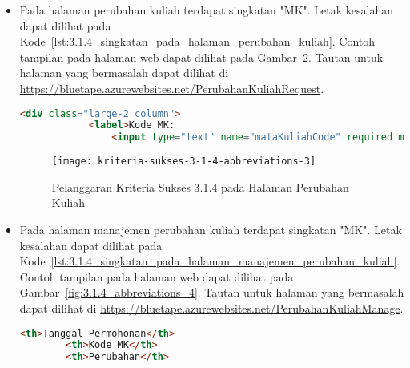 \begin{itemize}
    \begin{figure}[h]
        \centering  
        \texttt{[image: kriteria-sukses-3-1-4-abbreviations-2]}  
        \caption[Pelanggaran Kriteria Sukses 3.1.4 pada Halaman Manajemen Cetak Transkrip]{Pelanggaran Kriteria Sukses 3.1.4 pada Halaman Manajemen Cetak Transkrip}
        \label{fig:3.1.4_abbreviations_2}  
    \end{figure}
    
    \item Pada halaman perubahan kuliah terdapat singkatan "MK". Letak kesalahan dapat dilihat pada \mbox{Kode \ref{lst:3.1.4_singkatan_pada_halaman_perubahan_kuliah}}. Contoh tampilan pada halaman web dapat dilihat pada \mbox{Gambar \ref{fig:3.1.4_abbreviations_3}}. Tautan untuk halaman yang bermasalah dapat dilihat di \url{https://bluetape.azurewebsites.net/PerubahanKuliahRequest}.
    \begin{lstlisting}[frame=single, label={lst:3.1.4_singkatan_pada_halaman_perubahan_kuliah}, language=HTML, caption=Pelanggaran Kriteria Sukses 3.1.4 pada Halaman Perubahan Kuliah]
        <div class="large-2 column">
            <label>Kode MK:
                <input type="text" name="mataKuliahCode" required maxlength="9" pattern="[A-Z]{3}[0-9]{3}([0-9]{3})?" title="Kode MK dalam format XYZ123"/>
    \end{lstlisting}

    \begin{figure}[H]
        \centering  
        \texttt{[image: kriteria-sukses-3-1-4-abbreviations-3]}  
        \caption[Pelanggaran Kriteria Sukses 3.1.4 pada Halaman Perubahan Kuliah]{Pelanggaran Kriteria Sukses 3.1.4 pada Halaman Perubahan Kuliah}
        \label{fig:3.1.4_abbreviations_3}  
    \end{figure}
    
    \item Pada halaman manajemen perubahan kuliah terdapat singkatan "MK". Letak kesalahan dapat dilihat pada \mbox{Kode \ref{lst:3.1.4_singkatan_pada_halaman_manajemen_perubahan_kuliah}}. Contoh tampilan pada halaman web dapat dilihat pada \mbox{Gambar \ref{fig:3.1.4_abbreviations_4}}. Tautan untuk halaman yang bermasalah dapat dilihat di \url{https://bluetape.azurewebsites.net/PerubahanKuliahManage}.
    \begin{lstlisting}[frame=single, label={lst:3.1.4_singkatan_pada_halaman_manajemen_perubahan_kuliah}, language=HTML, caption=Pelanggaran Kriteria Sukses 3.1.4 pada Halaman Manajemen Perubahan Kuliah]
        <th>Tanggal Permohonan</th>
        <th>Kode MK</th>
        <th>Perubahan</th>
    \end{lstlisting}


\end{itemize}
